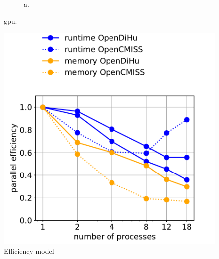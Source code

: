 \begin{figure}[H]
\begin{subfigure}[t]{0.48\textwidth}
    \caption{a.}%
    \label{fig:16_hodgkin_huxley_gpu}%
  \end{subfigure}   
  \caption{gpu.}%
  \label{fig:16_hodgkin_huxley_cpu_gpu}%
\end{figure}%

\begin{figure}[H]
  \centering%
  \includegraphics[width=\textwidth]{images/results/studies/0_weak_scaling_efficiency.pdf}%
  \caption{Efficiency model}%
  \label{fig:roofline}%
\end{figure}%

